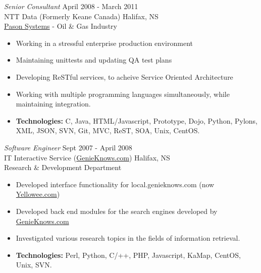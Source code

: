 \documentclass[line,margin]{res}
\begin{document}
\begin{resume}
   {\sl Senior Consultant} \hfill April 2008 - March 2011 \\
   NTT Data (Formerly Keane Canada) \hfill Halifax, NS \\
    \href{http://www.pason.com/}{Pason Systems} - Oil {\&} Gas Industry \smallskip
    \begin{itemize}  \itemsep -2pt %
     \item Working in a stressful enterprise production environment
     \item Maintaining unittests and updating QA test plans
     \item Developing ReSTful services, to acheive Service Oriented Architecture
     \item Working with multiple programming languages
            simultaneously, while \\ maintaining integration.
     \item {\bf Technologies:} \hspace{1pt}
        C, Java, HTML/Javascript, Prototype, Dojo, Python, Pylons, \newline
        \hspace*{72pt} XML, JSON, SVN, Git, MVC, ReST, SOA, Unix, CentOS.
    \end{itemize}

\newpage
\opening
\addvspace{\sectionskip}

   {\sl Software Engineer} \hfill Sept 2007 - April 2008 \\
    IT Interactive Service (\href{http://www.genieknows.com}{GenieKnows.com}) \hfill Halifax, NS \\
    Research {\&} Development Department \smallskip
    \begin{itemize}  \itemsep -2pt %
     \item Developed interface functionality for
             local.genieknows.com (now \href{http://www.yellowee.com}{Yellowee.com})
     \item Developed back end modules for the search
             engines developed by
             \href{http://www.genieknows.com}{GenieKnows.com}
     \item Investigated various research topics
             in the fields of information retrieval.
     \item {\bf Technologies:} \hspace{1pt}
        Perl, Python, C/++, PHP, Javascript, KaMap, CentOS, \\
        \hspace*{72pt} Unix, SVN.
    \end{itemize}


\end{resume}
\end{document}
